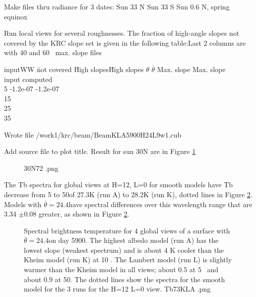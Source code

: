 \documentclass{article}
\begin{document}
Make files thru radiance for 3 dates:
 Sun 33 N
 Sun 33 S
 Sun 0.6 N, spring equinox

 Run local views for several roughnesses. The fraction of high-angle slopes not
 covered by the KRC slope set is given in the following table:Last 2 columns are
 with 40 and 60\qd~ max. slope files
\begin{tabbing}
inputWW \= not covered \=  High slopes\= High slopes \kill
$\theta$ \> $\overline{\theta}$ \> Max. slope \>  Max. slope \\
input   \> computed \qd  {}\qd \\
5   \> -1.2e-07 \>  -1.2e-07 \\
15    \\
25      \\
35   \>      \\
\end{tabbing}

 Wrote file /work1/krc/beam/BeamKLA5900H24L9w1.cub


Add source file to plot title. Result for sun 30N are in Figure 
\ref{30N72}
\begin{figure}[!ht] 
\caption[Beam profiles with Sun 30N]{
\label{30N72} 30N72 .png  }
\end{figure} 

 The Tb spectra for global views at H=12, L=0 for smooth models have Tb decrease
 from 5 to 50\um of 27.3K (run A) to 28.2K (run K), dotted lines in Figure
 \ref{Tb73KLA}.  Models with $\overline{\theta}=24.4$\qd have spectral
 differences over this wavelength range that are 3.34 $\pm$0.08 greater, as
 shown in Figure \ref{Tb73KLA}.

\begin{figure}[!ht] 
\caption[Global Tb]{Spectral brightness temperature for 4 global views of a
  surface with $\overline{\theta}=24.4$\qd on day 5900. The highest albedo model
  (run A) has the lowest slope (weakest spectrum) and is about 4 K cooler than
  the Kheim model (run K) at 10 \um. The Lambert model (run L) is slightly
  warmer than the Kheim model in all views; about 0.5 at 5\um~ and about 0.9 at
  50\um. The dotted lines show the spectra for the smooth model for the 3 runs
  for the H=12 L=0 view.
\label{Tb73KLA} Tb73KLA .png  }
\end{figure} 
\end{document}
